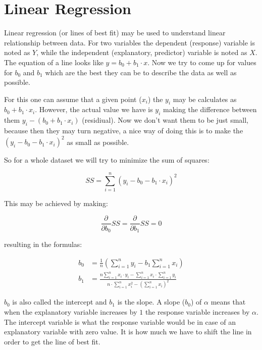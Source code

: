 \chapter*{Linear Regression}

\setcounter{section}{0}
\renewcommand*{\theHsection}{ch7.\the\value{section}}

Linear regression (or lines of best fit) may be used to understand linear
relationship between data. For two variables the dependent (response) variable
is noted as $Y$, while the independent (explanatory, predictor) variable is
noted as $X$. The equation of a line looks like $y=b_0+b_1 \cdot x$. Now we try to
come up for values for $b_0$ and $b_1$ which are the best they can be to
describe the data as well as possible.

For this one can assume that a given point ($x_i$) the $y_i$ may be calculates
as $b_0+b_1 \cdot x_i$. However, the actual value we have is $y_i$ making the
difference between them $y_i-(b_0+b_1 \cdot x_i)$ (residiual). Now we
don't want them to be just small, because then they may turn negative, a nice way of
doing this is to make the $(y_i-b_0-b_1 \cdot x_i)^2$ as small as possible.


So for a whole dataset we will try to minimize the sum of squares:

\[ SS = \sum_{i=1}^n (y_i-b_0-b_1 \cdot x_i)^2 \]

This may be achieved by making:

\[ \frac{\partial}{\partial b_0}SS = \frac{\partial}{\partial b_1} SS = 0 \]

resulting in the formulas:

\begin{align*}
b_0 &= \frac{1}{n} \left( \sum_{i=1}^{n} y _i - b_1 \sum_{i=1}^{n} x_i \right)
\\
b_1 &= \frac{n \sum_{i=1}^{n} x_i \cdot y_i - \sum_{i=1}^{n} x_i 
\cdot \sum_{i=1}^{n} y_i}{n \cdot \sum_{i=1}^{n} x_i^2 - \left(\sum_{i=1}^{n}
x_i \right)^2}
\end{align*}

$b_0$ is also called the intercept and $b_1$ is the slope. A slope ($b_0$) of
$\alpha$ means that when the explanatory variable increases by $1$ the response
variable increases by $\alpha$. The intercept variable is what the response
variable would be in case of an explanatory variable with zero value. It is how
much we have to shift the line in order to get the line of best fit.

